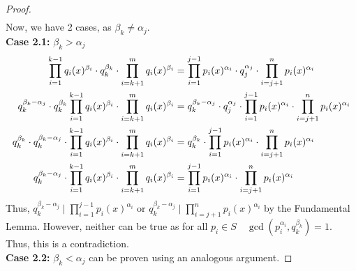 \begin{proof}
\begin{align*}
\end{align*}
Now, we have 2 cases, as $\beta_k \neq \alpha_j$. \\
\textbf{Case 2.1: }$\beta_k > \alpha_j$ 
\begin{align*}
    \prod _{i=1}^{k-1}q_i(x)^{\beta_i} \cdot q_k^{\beta_k} \cdot \prod _{i=k+1}^{m}q_i(x)^{\beta_i} &= \prod _{i=1}^{j-1}p_i(x)^{\alpha_i} \cdot q_j^{\alpha_j} \cdot \prod _{i=j+1}^{n}p_i(x)^{\alpha_i}\\
    q_k^{\beta_k-\alpha_j} \cdot q_k^{\beta_k} \prod _{i=1}^{k-1}q_i(x)^{\beta_i} \cdot \prod _{i=k+1}^{m}q_i(x)^{\beta_i} &= q_k^{\beta_k-\alpha_j} \cdot q_j^{\alpha_j} \cdot \prod _{i=1}^{j-1}p_i(x)^{\alpha_i} \cdot \prod _{i=j+1}^{n}p_i(x)^{\alpha_i}\\
     q_k^{\beta_k}  \cdot q_k^{\beta_k-\alpha_j} \cdot\prod _{i=1}^{k-1}q_i(x)^{\beta_i} \cdot \prod _{i=k+1}^{m}q_i(x)^{\beta_i} &= q_k^{\beta_k}\cdot \prod _{i=1}^{j-1}p_i(x)^{\alpha_i} \cdot \prod _{i=j+1}^{n}p_i(x)^{\alpha_i}\\
    q_k^{\beta_k-\alpha_j} \cdot\prod _{i=1}^{k-1}q_i(x)^{\beta_i} \cdot \prod _{i=k+1}^{m}q_i(x)^{\beta_i} &= \prod _{i=1}^{j-1}p_i(x)^{\alpha_i} \cdot \prod _{i=j+1}^{n}p_i(x)^{\alpha_i}\\
\end{align*}
Thus, $q_k^{\beta_k-\alpha_j} \mid \prod _{i=1}^{j-1}p_i(x)^{\alpha_i}$ or $q_k^{\beta_k-\alpha_j} \mid \prod _{i=j+1}^{n}p_i(x)^{\alpha_i}$ by the Fundamental Lemma. However, neither can be true as for all  $p_i \in S \quad \gcd(p_i^{\alpha_i}, q_k^{\beta_k}) = 1$. Thus, this is a contradiction.\\
\textbf{Case 2.2: }$\beta_k <\alpha_j$ can be proven using an analogous argument. 
\end{proof}



